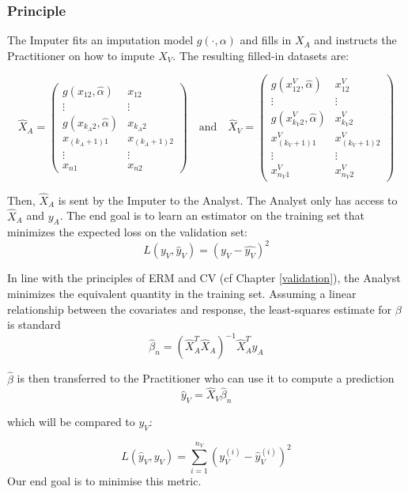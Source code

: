 			\subsubsection{Principle}
The Imputer fits an imputation model $g(\cdot, \alpha)$ and fills in $X_A$ and instructs the Practitioner on how to impute $X_V$. The resulting filled-in datasets are:

\begin{equation*}
\hat{X}_A = 
\begin{pmatrix}
g(x_{12},\hat{\alpha}) & x_{12} \\
\vdots & \vdots \\
g(x_{k_A 2},\hat{\alpha}) & x_{k_A 2} \\
x_{(k_A+1)1} & x_{(k_A+1)2}\\
\vdots & \vdots \\
x_{n 1} & x_{n 2}
\end{pmatrix}
\quad \mathrm{and} \quad
\hat{X}_V = 
\begin{pmatrix}
g(x_{12}^V,\hat{\alpha}) & x_{12}^V \\
\vdots & \vdots \\
g(x_{k_V 2}^V,\hat{\alpha}) & x_{k_V 2}^V \\
x_{(k_V+1)1}^V & x_{(k_V+1)2}^V\\
\vdots & \vdots \\
x_{n_V 1}^V & x_{n_V 2}^V
\end{pmatrix}
\end{equation*}

Then, $\hat{X}_A$ is sent by the Imputer to the Analyst. The Analyst only has access to $\hat{X}_A$ and $y_A$. 
The end goal is to learn an estimator on the training set that minimizes the expected loss on the validation set:
$$
L(y_V, \hat{y}_V) = (y_V - \hat{y_V})^2
$$

In line with the principles of ERM and CV (cf Chapter \ref{validation}), the Analyst minimizes the equivalent quantity in the training set. Assuming a linear relationship between the covariates and response, the least-squares estimate for $\beta$ is standard \cite{seber2012linear}
$$
\hat{\beta}_n = (\hat{X}_A^T \hat{X}_A)^{-1} \hat{X}_A^T y_A 
$$

$\hat{\beta}$ is then transferred to the Practitioner who can use it to compute a prediction
$$\hat{y}_V = \hat{X}_V \hat{\beta}_n $$

which will be compared to $y_V$:

$$L(\hat{y}_V, y_V) = \sum\limits_{i=1}^{n_V} (y_V^{(i)} - \hat{y}_V^{(i)})^2$$
Our end goal is to minimise this metric. 

